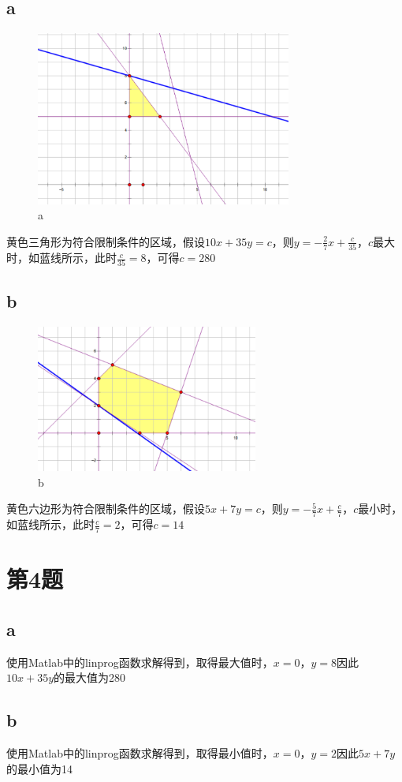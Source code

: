 \documentclass{article}
\begin{document}
\subsection{a}
\begin{figure}[!h]
    \centering
    \includegraphics[width=0.75\textwidth]{pic/01.png}
    \caption{a}
\end{figure}

黄色三角形为符合限制条件的区域，假设$10x+35y=c$，则$y=-\frac{2}{7}x+\frac{c}{35}$，$c$最大时，如蓝线所示，此时$\frac{c}{35} = 8$，可得$c = 280$

\subsection{b}
\begin{figure}[!h]
    \centering
    \includegraphics[width=0.65\textwidth]{pic/02.png}
    \caption{b}
\end{figure}

黄色六边形为符合限制条件的区域，假设$5x+7y=c$，则$y=-\frac{5}{7}x+\frac{c}{7}$，$c$最小时，如蓝线所示，此时$\frac{c}{7} = 2$，可得$c = 14$


\section{第4题}
\subsection{a}
使用Matlab中的linprog函数求解得到，取得最大值时，$x=0$，$y=8$因此$10x+35y$的最大值为280

\subsection{b}
使用Matlab中的linprog函数求解得到，取得最小值时，$x=0$，$y=2$因此$5x+7y$的最小值为14
\end{document}
